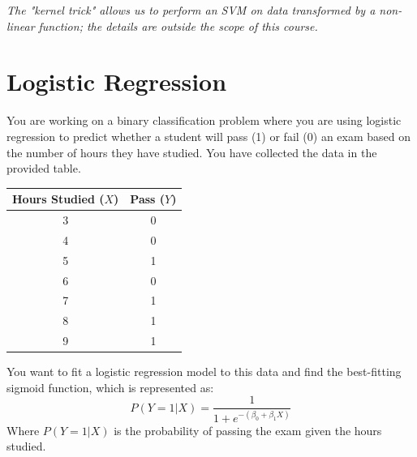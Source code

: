 \documentclass[]{article}
\begin{document}
	\textit{The "kernel trick" allows us to perform an SVM on data transformed by a non-linear function; the details are outside the scope of this course.}
	
	
	
	
	
	\section{Logistic Regression}
	You are working on a binary classification problem where you are using logistic regression to predict whether a student will pass (1) or fail (0) an exam based on the number of hours they have studied. You have collected the data in the provided table.
	
	\begin{table}[h!]
		\centering
		\begin{tabular}{|c|c|}
			\hline
			Hours Studied ($X$) & Pass ($Y$) \\
			\hline
			3 & 0 \\
			4 & 0 \\
			5 & 1 \\
			6 & 0 \\
			7 & 1 \\
			8 & 1 \\
			9 & 1 \\
			\hline
		\end{tabular}
	\end{table}
	
	You want to fit a logistic regression model to this data and find the best-fitting sigmoid function, which is represented as:
	$$P(Y=1|X) = \frac{1}{1 + e^{-(\beta_0 + \beta_1X)}}$$
	Where $P(Y=1|X)$ is the probability of passing the exam given the hours studied.
	
\end{document}
